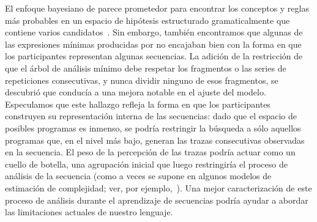El enfoque bayesiano de \lot parece prometedor para encontrar los conceptos y reglas más probables en un espacio de hipótesis estructurado gramaticalmente que contiene varios candidatos~\cite{goodman2008rational,piantadosi2016four,romano2018bayesian}. Sin embargo, también encontramos que algunas de las expresiones mínimas producidas por \grambin no encajaban bien con la forma en que los participantes representan algunas secuencias. La adición de la restricción de que el árbol de análisis mínimo debe respetar los fragmentos o las series de repeticiones consecutivas, y nunca dividir ninguno de esos fragmentos, se descubrió que conducía a una mejora notable en el ajuste del modelo. Especulamos que este hallazgo refleja la forma en que los participantes construyen su representación interna de las secuencias: dado que el espacio de posibles programas es inmenso, se podría restringir la búsqueda a sólo aquellos programas que, en el nivel más bajo, generan las trazas consecutivas observadas en la secuencia. El peso de la percepción de las trazas podría actuar como un cuello de botella, una agrupación inicial que luego restringiría el proceso de análisis de la secuencia (como a veces se supone en algunos modelos de estimación de complejidad; ver, por ejemplo,~\cite{f98}). Una mejor caracterización de este proceso de análisis durante el aprendizaje de secuencias podría ayudar a abordar las limitaciones actuales de nuestro lenguaje.

